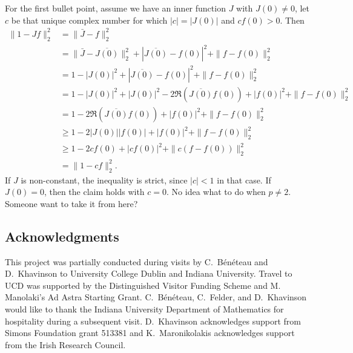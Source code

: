 \documentclass{article}
\theoremstyle{plain}
\numberwithin{Theorem}{section}
\numberwithin{equation}{section}
\theoremstyle{plain}
\theoremstyle{definition}
\renewcommand{\geq}{\geqslant}
\begin{document}
{\color{Emerald}  For the first bullet point, assume we have an inner function $J$ with $J(0)\neq 0$, let $c$ be that unique complex number for which $|c| = |J(0)|$ and $cf(0)>0$.  Then
\begin{align*}
     \| 1 - Jf \|_2^2 &=  \| \bar{J} - f \|_2^2 \\
           &=  \| \bar{J} - \overline{J(0)} \|_2^2 + |\overline{J(0)} - f(0)|^2 + \|f - f(0)\|_2^2 \\
           &=   1 - |J(0)|^2 + |\overline{J(0)} - f(0)|^2 + \|f - f(0)\|_2^2 \\
           &=   1 - |J(0)|^2 + |J(0)|^2 - 2\Re(\overline{J(0)}f(0)) + |f(0)|^2 + \|f - f(0)\|_2^2 \\
           &=   1  - 2\Re(\overline{J(0)}f(0)) + |f(0)|^2 + \|f - f(0)\|_2^2 \\
           &\geq     1 - 2|J(0)| |f(0)| + |f(0)|^2 + \|f - f(0)\|_2^2 \\
           &\geq  1 - 2 c f(0) + |cf(0)|^2 + \|c(f - f(0))\|_2^2 \\
           &=  \|1 - cf\|_2^2.
\end{align*}
If $J$ is non-constant, the inequality is strict, since $|c|<1$ in that case.  If $J(0)=0$, then the claim holds with $c=0$.
No idea what to do when $p \neq 2$.  Someone want to take it from here?
}
\fi

\subsection*{Acknowledgments} This project was partially conducted during visits by C.\ B\'en\'eteau and D.\ Khavinson to University College Dublin and Indiana University. Travel to UCD was supported by the Distinguished Visitor Funding Scheme and M. Manolaki's Ad Astra Starting Grant. C.\ B\'en\'eteau, C.\, Felder, and D.\ Khavinson would like to thank the Indiana University Department of Mathematics for hospitality during a subsequent visit. D.\ Khavinson acknowledges support from Simons Foundation grant 513381 and K.\ Maronikolakis acknowledges support from the Irish Research Council.







 



\end{document}
